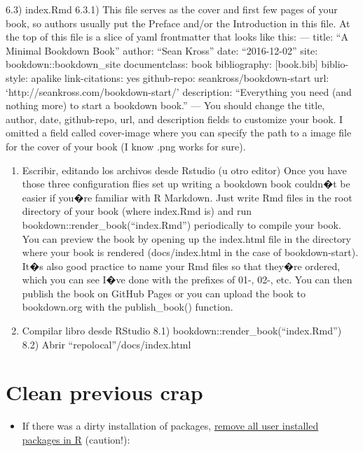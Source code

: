 \documentclass[]{book}
\providecommand{\tightlist}{%
  \setlength{\itemsep}{0pt}\setlength{\parskip}{0pt}}
\theoremstyle{definition}
\theoremstyle{definition}
\theoremstyle{definition}
\theoremstyle{remark}
\begin{document}
6.3) index.Rmd 6.3.1) This file serves as the cover and first few pages
of your book, so authors usually put the Preface and/or the Introduction
in this file. At the top of this file is a slice of yaml frontmatter
that looks like this: --- title: ``A Minimal Bookdown Book'' author:
``Sean Kross'' date: ``2016-12-02'' site: bookdown::bookdown\_site
documentclass: book bibliography: {[}book.bib{]} biblio-style: apalike
link-citations: yes github-repo: seankross/bookdown-start url:
`http://seankross.com/bookdown-start/' description: ``Everything you
need (and nothing more) to start a bookdown book.'' --- You should
change the title, author, date, github-repo, url, and description fields
to customize your book. I omitted a field called cover-image where you
can specify the path to a image file for the cover of your book (I know
.png works for sure).

\begin{enumerate}
\def\labelenumi{\arabic{enumi})}
\setcounter{enumi}{6}
\item
  Escribir, editando los archivos desde Rstudio (u otro editor) Once you
  have those three configuration flies set up writing a bookdown book
  couldn�t be easier if you�re familiar with R Markdown. Just write Rmd
  files in the root directory of your book (where index.Rmd is) and run
  bookdown::render\_book(``index.Rmd'') periodically to compile your
  book. You can preview the book by opening up the index.html file in
  the directory where your book is rendered (docs/index.html in the case
  of bookdown-start). It�s also good practice to name your Rmd files so
  that they�re ordered, which you can see I�ve done with the prefixes of
  01-, 02-, etc. You can then publish the book on GitHub Pages or you
  can upload the book to bookdown.org with the publish\_book() function.
\item
  Compilar libro desde RStudio 8.1)
  bookdown::render\_book(``index.Rmd'') 8.2) Abrir
  ``repolocal''/docs/index.html
\end{enumerate}

\hypertarget{ref_CleanPreviousCrap}{\chapter{Clean previous
crap}\label{ref_CleanPreviousCrap}}

\begin{itemize}
\tightlist
\item
  If there was a dirty installation of packages,
  \href{https://www.r-bloggers.com/how-to-remove-all-user-installed-packages-in-r/}{remove
  all user installed packages in R} (caution!):
\end{itemize}
\end{document}

